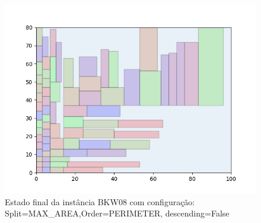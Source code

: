 \begin{figure}[H]
    \centering
    \caption[]{Estado final da instância BKW08 com configuração: Split=MAX_AREA,Order=PERIMETER, descending=False}
    \label{fig:bkw08-max_area-perimeter-false}
    \includegraphics[scale=0.5]{output/figures/bkw/bkw08/max_area/perimeter/false/00}
\end{figure}